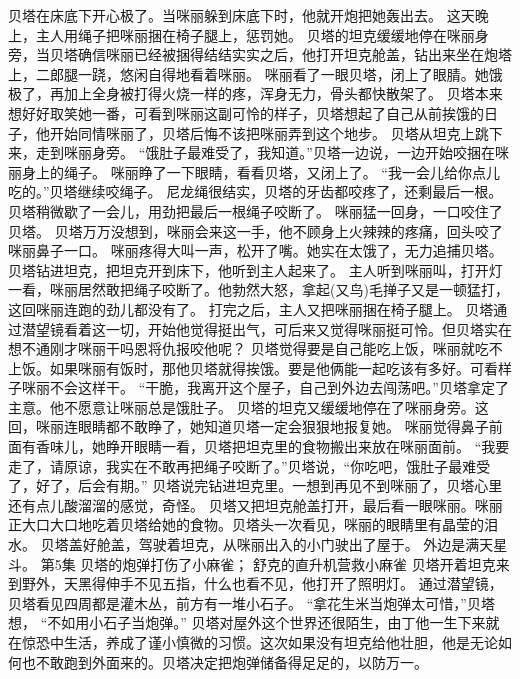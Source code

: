 \documentclass[a4paper,12pt,UTF8,twoside]{ctexbook}
\begin{document}
        贝塔在床底下开心极了。当咪丽躲到床底下时，他就开炮把她轰出去。 
        这天晚上，主人用绳子把咪丽捆在椅子腿上，惩罚她。 
        贝塔的坦克缓缓地停在咪丽身旁，当贝塔确信咪丽已经被捆得结结实实之后，他打开坦克舱盖，钻出来坐在炮塔上，二郎腿一跷，悠闲自得地看着咪丽。 
        咪丽看了一眼贝塔，闭上了眼腈。她饿极了，再加上全身被打得火烧一样的疼，浑身无力，骨头都快散架了。 
        贝塔本来想好好取笑她一番，可看到咪丽这副可怜的样子，贝塔想起了自己从前挨饿的日子，他开始同情咪丽了，贝塔后悔不该把咪丽弄到这个地步。 
        贝塔从坦克上跳下来，走到咪丽身旁。 
        “饿肚子最难受了，我知道。”贝塔一边说，一边开始咬捆在咪丽身上的绳子。 
        咪丽睁了一下眼睛，看看贝塔，又闭上了。 
        “我一会儿给你点儿吃的。”贝塔继续咬绳子。 
        尼龙绳很结实，贝塔的牙齿都咬疼了，还剩最后一根。贝塔稍微歇了一会儿，用劲把最后一根绳子咬断了。 
        咪丽猛一回身，一口咬住了贝塔。 
        贝塔万万没想到，咪丽会来这一手，他不顾身上火辣辣的疼痛，回头咬了咪丽鼻子一口。 
        咪丽疼得大叫一声，松开了嘴。她实在太饿了，无力追捕贝塔。 
        贝塔钻进坦克，把坦克开到床下，他听到主人起来了。 
        主人听到咪丽叫，打开灯一看，咪丽居然敢把绳子咬断了。他勃然大怒，拿起(又鸟)毛掸子又是一顿猛打，这回咪丽连跑的劲儿都没有了。 
        打完之后，主人又把咪丽捆在椅子腿上。 
        贝塔通过潜望镜看着这一切，开始他觉得挺出气，可后来又觉得咪丽挺可怜。但贝塔实在想不通刚才咪丽干吗恩将仇报咬他呢？ 
        贝塔觉得要是自己能吃上饭，咪丽就吃不上饭。如果咪丽有饭时，那他贝塔就得挨饿。要是他俩能一起吃该有多好。可看样子咪丽不会这样干。 
        “干脆，我离开这个屋子，自己到外边去闯荡吧。”贝塔拿定了主意。他不愿意让咪丽总是饿肚子。 
        贝塔的坦克又缓缓地停在了咪丽身旁。这回，咪丽连眼睛都不敢睁了，她知道贝塔一定会狠狠地报复她。 
        咪丽觉得鼻子前面有香味儿，她睁开眼睛一看，贝塔把坦克里的食物搬出来放在咪丽面前。 
        “我要走了，请原谅，我实在不敢再把绳子咬断了。”贝塔说，“你吃吧，饿肚子最难受了，好了，后会有期。” 
        贝塔说完钻进坦克里。一想到再见不到咪丽了，贝塔心里还有点儿酸溜溜的感觉，奇怪。 
        贝塔又把坦克舱盖打开，最后看一眼咪丽。咪丽正大口大口地吃着贝塔给她的食物。贝塔头一次看见，咪丽的眼睛里有晶莹的泪水。 
        贝塔盖好舱盖，驾驶着坦克，从咪丽出入的小门驶出了屋于。 
        外边是满天星斗。   第5集 
        贝塔的炮弹打伤了小麻雀； 
        舒克的直升机营救小麻雀   
        贝塔开着坦克来到野外，天黑得伸手不见五指，什么也看不见，他打开了照明灯。 
        通过潜望镜，贝塔看见四周都是灌木丛，前方有一堆小石子。 
        “拿花生米当炮弹太可惜，”贝塔想，  “不如用小石子当炮弹。” 
        贝塔对屋外这个世界还很陌生，由丁他一生下来就在惊恐中生活，养成了谨小慎微的习惯。这次如果没有坦克给他壮胆，他是无论如何也不敢跑到外面来的。贝塔决定把炮弹储备得足足的，以防万一。 
\end{document}
